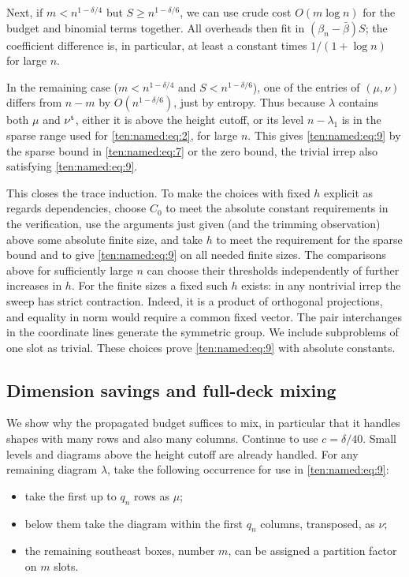 Next, if \(m<n^{1-\delta/4}\) but \(S\ge n^{1-\delta/6}\), we can use crude cost \(O(m\log n)\) for the budget and binomial terms together. All overheads then fit in \((\beta_n-\bar\beta)S\); the coefficient difference is, in particular, at least a constant times \(1/(1+\log n)\) for large \(n\).

In the remaining case (\(m<n^{1-\delta/4}\) and \(S<n^{1-\delta/6}\)), one of the entries of \((\mu,\nu)\) differs from \(n-m\) by \(O(n^{1-\delta/6})\), just by entropy. Thus because \(\lambda\) contains both \(\mu\) and \(\nu^{\rm t}\), either it is above the height cutoff, or its level \(n-\lambda_1\) is in the sparse range used for \eqref{ten:named:eq:2}, for large \(n\). This gives \eqref{ten:named:eq:9} by the sparse bound in \eqref{ten:named:eq:7} or the zero bound, the trivial irrep also satisfying \eqref{ten:named:eq:9}.

This closes the trace induction. To make the choices with fixed \(h\) explicit as regards dependencies, choose \(C_0\) to meet the absolute constant requirements in the verification, use the arguments just given (and the trimming observation) above some absolute finite size, and take \(h\) to meet the requirement for the sparse bound and to give \eqref{ten:named:eq:9} on all needed finite sizes. The comparisons above for sufficiently large \(n\) can choose their thresholds independently of further increases in \(h\). For the finite sizes a fixed such \(h\) exists: in any nontrivial irrep the sweep has strict contraction. Indeed, it is a product of orthogonal projections, and equality in norm would require a common fixed vector. The pair interchanges in the coordinate lines generate the symmetric group. We include subproblems of one slot as trivial. These choices prove \eqref{ten:named:eq:9} with absolute constants.

\subsection{Dimension savings and full-deck mixing}
We show why the propagated budget suffices to mix, in particular that it handles shapes with many rows and also many columns. Continue to use \(c=\delta/40\). Small levels and diagrams above the height cutoff are already handled. For any remaining diagram \(\lambda\), take the following occurrence for use in \eqref{ten:named:eq:9}:
\begin{itemize}
\item take the first up to \(q_n\) rows as \(\mu\);
\item below them take the diagram within the first \(q_n\) columns, transposed, as \(\nu\);
\item the remaining southeast boxes, number \(m\), can be assigned a partition factor on \(m\) slots.
\end{itemize}

